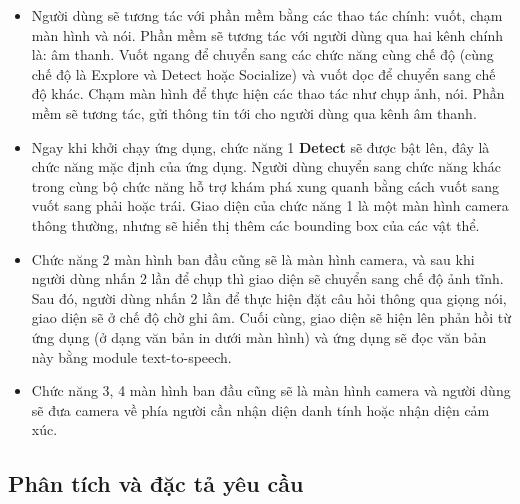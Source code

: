\documentclass[a4paper,12pt]{article}
\begin{document}
\begin{itemize}
    \item Người dùng sẽ tương tác với phần mềm bằng các thao tác chính: vuốt, chạm màn hình và nói. Phần mềm sẽ tương tác với người dùng qua hai kênh chính là: âm thanh. Vuốt ngang để chuyển sang các chức năng cùng chế độ (cùng chế độ là Explore và Detect hoặc Socialize) và vuốt dọc để chuyển sang chế độ khác. Chạm màn hình để thực hiện các thao tác như chụp ảnh, nói. Phần mềm sẽ tương tác, gửi thông tin tới cho người dùng qua kênh âm thanh.
    \item Ngay khi khởi chạy ứng dụng, chức năng 1 \textbf{Detect} sẽ được bật lên, đây là chức năng mặc định của ứng dụng. Người dùng chuyển sang chức năng khác trong cùng bộ chức năng hỗ trợ khám phá xung quanh bằng cách vuốt sang vuốt sang phải hoặc trái. Giao diện của chức năng 1 là một màn hình camera thông thường, nhưng sẽ hiển thị thêm các bounding box của các vật thể.
    \item Chức năng 2 màn hình ban đầu cũng sẽ là màn hình camera, và sau khi người dùng nhấn 2 lần để chụp thì giao diện sẽ chuyển sang chế độ ảnh tĩnh. Sau đó, người dùng nhấn 2 lần để thực hiện đặt câu hỏi thông qua giọng nói, giao diện sẽ ở chế độ chờ ghi âm. Cuối cùng, giao diện sẽ hiện lên phản hồi từ ứng dụng (ở dạng văn bản in dưới màn hình) và ứng dụng sẽ đọc văn bản này bằng module text-to-speech.
    \item Chức năng 3, 4 màn hình ban đầu cũng sẽ là màn hình camera và người dùng sẽ đưa camera về phía người cần nhận diện danh tính hoặc nhận diện cảm xúc.
\end{itemize}
\subsection{Phân tích và đặc tả yêu cầu}
\end{document}
